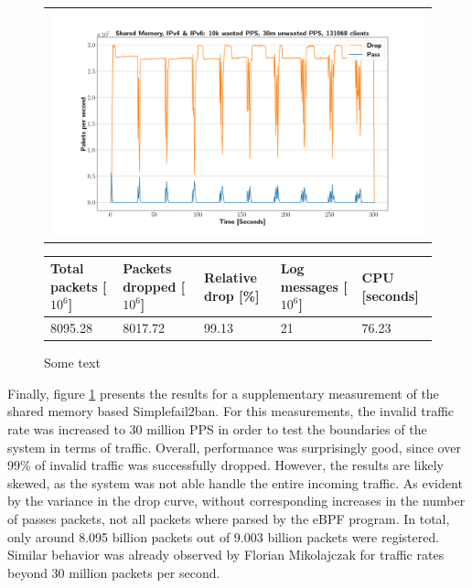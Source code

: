 \begin{figure}[!h]
	\centering
	\scriptsize
	\begin{tabular}{c}
    	\centerline{\includegraphics[width=1.2\textwidth]{images/simplefail2ban_shm_ipv46_v10k_iv30m_c131068.png}}
	\end{tabular}
	\begin{tabular}{lllll}
		\toprule
		\textbf{Total packets [$10^6$]} & \textbf{Packets dropped [$10^6$]} & \textbf{Relative drop [\%]} & \textbf{Log messages [$10^6$]} & \textbf{CPU [seconds]} \\ \midrule 
		8095.28 & 8017.72 & 99.13 & 21 & 76.23 \\
		\bottomrule
	\end{tabular}
	\caption[Simplefail2ban, Shared Memory, IPv4 \& IPv6, 30m \ac{PPS}]{Some text}
	\label{fig:simplefail2ban:shm:ip46:30m}
\end{figure}

Finally, figure \ref{fig:simplefail2ban:shm:ip46:30m} presents the results for a supplementary measurement of the 
shared memory based Simplefail2ban. For this measurements, the invalid traffic rate was increased to 30 million \ac{PPS} in order to test the boundaries of the system in terms of traffic.  
Overall, performance was surprisingly good, since over 99\% of invalid traffic was successfully dropped. However, the results are likely skewed, as the system was not able handle
the entire incoming traffic. As evident by the variance in the drop curve, without corresponding increases in the number of passes packets, not all packets where parsed by the \ac{eBPF} program.
In total, only around 8.095 billion  packets out of 9.003 billion packets were registered. Similar behavior was already observed by Florian Mikolajczak \cite{mikolajczak2022} for traffic rates beyond
30 million packets per second.

